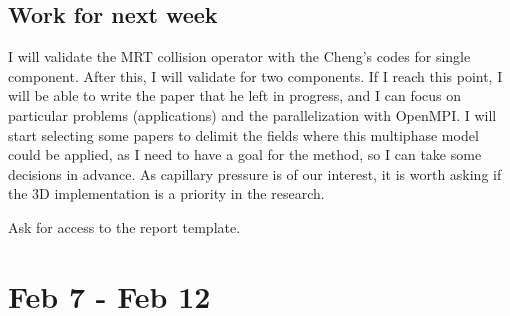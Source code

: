 \documentclass[12pt]{article}
\begin{document}
	\subsection*{Work for next week}
	I will validate the MRT collision operator with the Cheng's codes for single component. After this, I will validate for two components. If I reach this point, I will be able to write the paper that he left in progress, and I can focus on particular problems (applications) and the parallelization with OpenMPI. I will start selecting some papers to delimit the fields where this multiphase model could be applied, as I need to have a goal for the method, so I can take some decisions in advance. As capillary pressure is of our interest, it is worth asking if the 3D implementation is a priority in the research. 
	
	Ask for access to the report template.
	
	\pagebreak
	\section*{Feb 7 - Feb 12}
\end{document}
